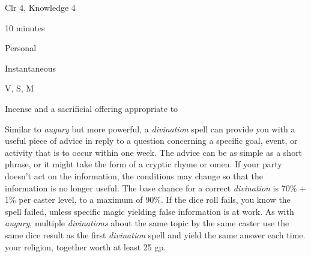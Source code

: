 
\begin{description*}
\item[Level:] Clr 4, Knowledge 4
\item[Casting Time:] 10 minutes
\item[Range:] Personal
\item[Duration:] Instantaneous
\item[Components:] V, S, M
\item[Arcane Material Component:] Incense and a sacrificial offering appropriate to
\end{description*}

Similar to \textit{augury} but more powerful, a \textit{divination} spell can provide
you with a useful piece of advice in reply to a question concerning a specific
goal, event, or activity that is to occur within one week. The advice can be as
simple as a short phrase, or it might take the form of a cryptic rhyme or omen.
If your party doesn't act on the information, the conditions may change so that
the information is no longer useful. The base chance for a correct \textit{divination
}is 70\% + 1\% per caster level, to a maximum of 90\%. If the dice roll fails,
you know the spell failed, unless specific magic yielding false information is
at work.
As with \textit{augury}, multiple \textit{divinations} about the same topic by
the same caster use the same dice result as the first \textit{divination} spell
and yield the same answer each time.
your religion, together worth at least 25 gp.